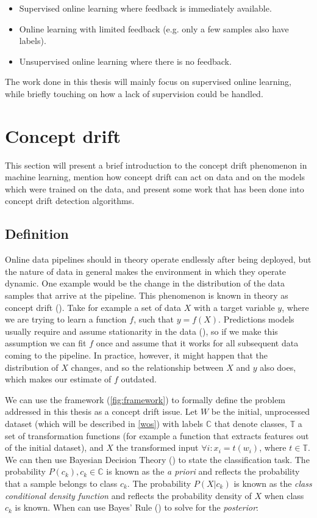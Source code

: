 \documentclass[12pt]{extreport}
\begin{document}
\begin{itemize}
    \item Supervised online learning where feedback is immediately available.
    \item Online learning with limited feedback (e.g. only a few samples also have labels).
    \item Unsupervised online learning where there is no feedback.
\end{itemize}

The work done in this thesis will mainly focus on supervised online learning, while briefly touching on how a lack of supervision could be handled.

\section{Concept drift} \label{concept-drift}

This section will present a brief introduction to the concept drift phenomenon in machine learning, mention how concept drift can act on data and on the models which were trained on the data, and present some work that has been done into concept drift detection algorithms.

\subsection{Definition}

Online data pipelines should in theory operate endlessly after being deployed, but the nature of data in general makes the environment in which they operate dynamic. One example would be the change in the distribution of the data samples that arrive at the pipeline. This phenomenon is known in theory as concept drift (\cite{survey-concept-drift}). Take for example a set of data $X$ with a target variable $y$, where we are trying to learn a function $f$, such that $y = f(X)$. Predictions models usually require and assume stationarity in the data (\cite{Heng_Wang_2015}), so if we make this assumption we can fit $f$ once and assume that it works for all subsequent data coming to the pipeline. In practice, however, it might happen that the distribution of $X$ changes, and so the relationship between $X$ and $y$ also does, which makes our estimate of $f$ outdated.

We can use the framework (\ref{fig:framework}) to formally define the problem addressed in this thesis as a concept drift issue. Let $W$ be the initial, unprocessed dataset (which will be described in \ref{wos}) with labels $\mathbb{C}$ that denote classes, $\mathbb{T}$ a set of transformation functions (for example a function that extracts features out of the initial dataset), and $X$ the transformed input $\forall i: x_i = t(w_i)$, where $t \in \mathbb{T}$. We can then use Bayesian Decision Theory (\cite{pattern-classification}) to state the classification task. The probability $P(c_k), c_k \in \mathbb{C}$ is known as the \emph{a priori} and reflects the probability that a sample belongs to class $c_k$. The probability $P(X|c_k)$ is known as the \emph{class conditional density function} and reflects the probability density of $X$ when class $c_k$ is known. When can use Bayes' Rule (\cite{bayesrule}) to solve for the \emph{posterior}:
\end{document}
